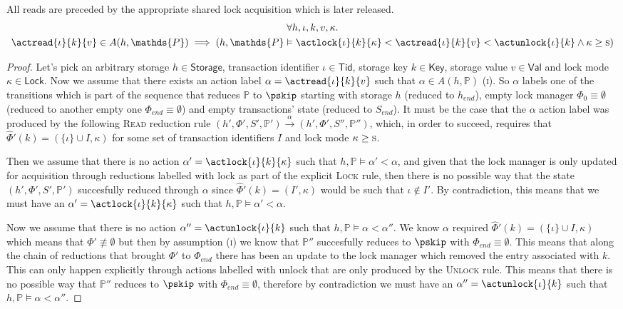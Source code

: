 \lem \label{lem:read} All reads are preceded by the appropriate shared lock acquisition which is later released.
\begin{gather*}
\forall h, \iota, k, v, \kappa \ldotp \\
\actread{\iota}{k}{v} \in A(h, \mathds{P}) \implies \left( h, \mathds{P} \vDash \actlock{\iota}{k}{\kappa} < \actread{\iota}{k}{v} < \actunlock{\iota}{k} \land \kappa \geq \textsc{s} \right)
\end{gather*}

\begin{proof}
Let's pick an arbitrary storage $h \in \mathsf{Storage}$, transaction identifier $\iota \in \mathsf{Tid}$, storage key $k \in \mathsf{Key}$, storage value $v \in \mathsf{Val}$ and lock mode $\kappa \in \mathsf{Lock}$. Now we assume that there exists an action label $\alpha = \actread{\iota}{k}{v}$ such that $\alpha \in A(h, \mathds{P})$ (\textsc{i}). So $\alpha$ labels one of the transitions which is part of the sequence that reduces $\mathds{P}$ to $\pskip$ starting with storage $h$ (reduced to $h_{end}$), empty lock manager $\Phi_0 \equiv \emptyset$ (reduced to another empty one $\Phi_{end} \equiv \emptyset$) and empty transactions' state (reduced to $S_{end}$). It must be the case that the $\alpha$ action label was produced by the following \textsc{Read} reduction rule $(h', \Phi', S', \mathds{P}') \xrightarrow{\alpha} (h', \Phi', S'', \mathds{P}'')$, which, in order to succeed, requires that $\hat{\Phi}'(k) = (\{ \iota \} \cup I, \kappa)$ for some set of transaction identifiers $I$ and lock mode $\kappa \geq \textsc{s}$.

Then we assume that there is no action $\alpha' = \actlock{\iota}{k}{\kappa}$ such that $h, \mathds{P} \vDash \alpha' < \alpha$, and given that the lock manager is only updated for acquisition through reductions labelled with \textsf{lock} as part of the explicit \textsc{Lock} rule, then there is no possible way that the state $(h', \Phi', S', \mathds{P}')$ succesfully reduced through $\alpha$ since $\hat{\Phi}'(k) = (I'
, \kappa)$ would be such that $\iota \not\in I'$. By contradiction, this means that we must have an $\alpha' = \actlock{\iota}{k}{\kappa}$ such that $h, \mathds{P} \vDash \alpha' < \alpha$.

Now we assume that there is no action $\alpha'' = \actunlock{\iota}{k}$ such that $h, \mathds{P} \vDash \alpha < \alpha ''$. We know $\alpha$ required $\hat{\Phi}'(k) = (\{ \iota \} \cup I, \kappa)$ which means that $\Phi' \not\equiv \emptyset$ but then by assumption (\textsc{i}) we know that $\mathds{P}''$ succesfully reduces to $\pskip$ with $\Phi_{end} \equiv \emptyset$. This means that along the chain of reductions that brought $\Phi'$ to $\Phi_{end}$ there has been an update to the lock manager which removed the entry associated with $k$. This can only happen explicitly through actions labelled with \textsf{unlock} that are only produced by the \textsc{Unlock} rule. This means that there is no possible way that $\mathds{P}''$ reduces to $\pskip$ with $\Phi_{end} \equiv \emptyset$, therefore by contradiction we must have an $\alpha'' = \actunlock{\iota}{k}$ such that $h, \mathds{P} \vDash \alpha < \alpha ''$.
\end{proof}

